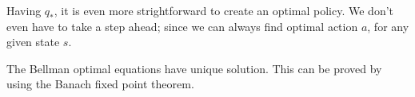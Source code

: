 \documentclass[../../main.tex]{subfiles}
\begin{document}
    Having $q_*$, it is even more strightforward to create an optimal policy. We don't even have to take a step ahead; since we can always find
    optimal action $a$, for any given state $s$.

    The Bellman optimal equations have unique solution. This can be proved by using the Banach fixed point theorem.
    
\end{document}
